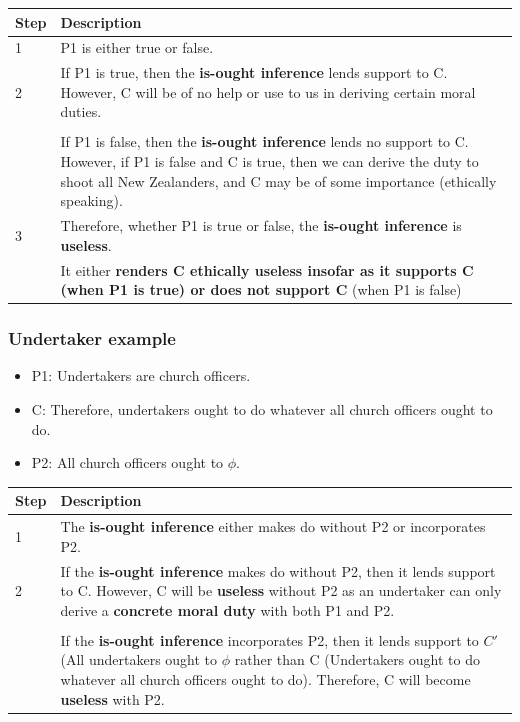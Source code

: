 \documentclass[11pt]{article}
\begin{document}
\begin{center}
\begin{tabular}{|m{5em}|m{25em}|}
\hline
Step & Description\\
\hline
1 & P1 is either true or false.\\
\hline
2 & If P1 is true, then the \textbf{is-ought inference} lends support to C. However, C will be of no help or use to us in deriving certain moral duties.\\
 & \\
 & If P1 is false, then the \textbf{is-ought inference} lends no support to C. However, if P1 is false and C is true, then we can derive the duty to shoot all New Zealanders, and C may be of some importance (ethically speaking).\\
\hline
3 & Therefore, whether P1 is true or false, the \textbf{is-ought inference} is \textbf{useless}.\\
 & It either \textbf{renders C ethically useless insofar as it supports C (when P1 is true) or does not support C} (when P1 is false)\\
\hline
\end{tabular}
\end{center}
 \newpage
\subsubsection{Undertaker example}
\label{sec:org083957f}
\begin{itemize}
\item P1: Undertakers are church officers.
\item C: Therefore, undertakers ought to do whatever all church officers ought to do.
\item P2: All church officers ought to \(\phi\).
\end{itemize}

\begin{center}
\begin{tabular}{|m{5em}|m{25em}|}
\hline
Step & Description\\
\hline
1 & The \textbf{is-ought inference} either makes do without P2 or incorporates P2.\\
\hline
2 & If the \textbf{is-ought inference} makes do without P2, then it lends support to C. However, C will be \textbf{useless} without P2 as an undertaker can only derive a \textbf{concrete moral duty} with both P1 and P2.\\
 & \\
 & If the \textbf{is-ought inference} incorporates P2, then it lends support to \(C'\) (All undertakers ought to \(\phi\) rather than C (Undertakers ought to do whatever all church officers ought to do). Therefore, C will become \textbf{useless} with P2.\\
\hline
\end{tabular}
\end{center}
\end{document}
